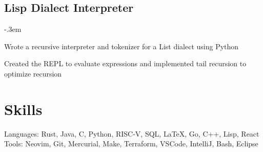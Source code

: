 \documentclass{article}
\let\olditemize=\itemize \let\endolditemize=\enditemize
\renewenvironment{itemize}{\olditemize[topsep=0em] \itemsep-.3em}{\endolditemize}
\begin{document}
\subsection{Lisp Dialect Interpreter}
\begin{itemize}
  \item Wrote a recursive interpreter and tokenizer for a List dialect using Python
  \item Created the REPL to evaluate expressions and implemented tail recursion to optimize recursion
\end{itemize}



\section{Skills}
Languages:
  Rust, Java, C, Python, RISC-V, SQL, LaTeX, Go, C++, Lisp, React\\
Tools:
  Neovim, Git, Mercurial, Make, Terraform, VSCode, IntelliJ, Bash, Eclipse\\
\end{document}
